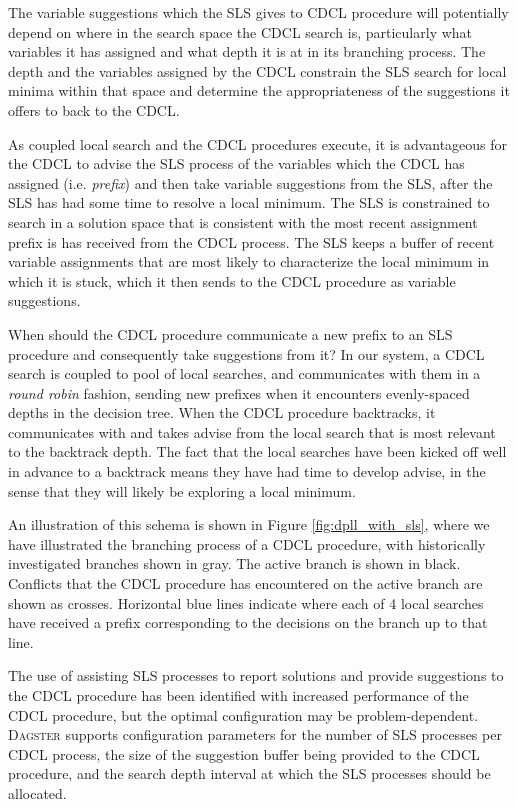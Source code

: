 \documentclass[
10pt, %
a4paper, %
oneside, %
headinclude,footinclude, %
BCOR5mm, %
]{scrartcl}
\begin{document}
The variable suggestions which the SLS gives to CDCL procedure will potentially depend on where in the search space the CDCL search is, particularly what variables it has assigned and what depth it is at in its branching process.
The depth and the variables assigned by the CDCL constrain the SLS search for local minima within that space and determine the appropriateness of the suggestions it offers to back to the CDCL.

As coupled local search  and the CDCL procedures execute, it is advantageous for the CDCL to advise the SLS process of the variables which the CDCL has assigned (i.e. {\em prefix}) and then take variable suggestions from the SLS, after the SLS has had some time to resolve a local minimum.
The SLS is constrained to search in a solution space that is consistent with the most recent assignment prefix is has received from the CDCL process. 
The SLS keeps a buffer of recent variable assignments that are most likely to characterize the local minimum in which it is stuck, which it then sends to the CDCL procedure as variable suggestions.

When should the CDCL procedure communicate a new prefix to an SLS procedure and consequently take suggestions from it?
In our system, a CDCL search is coupled to pool of local searches, and communicates with them in a {\em round robin} fashion, sending new prefixes when it encounters evenly-spaced depths in the decision tree.
When the CDCL procedure backtracks, it communicates with and takes advise from the local search that is most relevant to the backtrack depth.
The fact that the local searches have been kicked off well in advance to a backtrack means they have had time to develop advise, in the sense that they will likely be exploring a local minimum.

An illustration of this schema is shown in Figure \ref{fig:dpll_with_sls}, where we have illustrated the branching process of a CDCL procedure, with historically investigated branches shown in gray.
The active branch is shown in black.
Conflicts that the CDCL procedure has encountered on the active branch are shown as crosses.
Horizontal blue lines indicate where each of 4 local searches have received a prefix corresponding to the decisions on the branch up to that line.

The use of assisting SLS processes to report solutions and provide suggestions to the CDCL procedure has been identified with increased performance of the CDCL procedure, but the optimal configuration may be problem-dependent.
\textsc{Dagster} supports configuration parameters for the number of SLS processes per CDCL process, the size of the suggestion buffer being provided to the CDCL procedure, and the search depth interval at which the SLS processes should be allocated.
 
\end{document}
